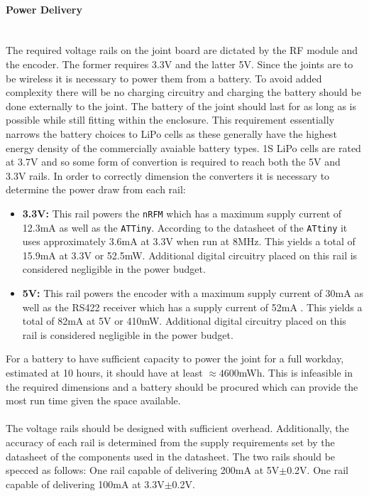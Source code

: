 \paragraph{Power Delivery}~\\ %
\label{par:power_delivery}
The required voltage rails on the joint board are dictated by the RF module and the encoder.
The former requires 3.3V and the latter 5V.
Since the joints are to be wireless it is necessary to power them from a battery.
To avoid added complexity there will be no charging circuitry and charging the battery should be done externally to the joint.
The battery of the joint should last for as long as is possible while still fitting within the enclosure.
This requirement essentially narrows the battery choices to LiPo cells as these generally have the highest energy density of the commercially avaiable battery types.
1S LiPo cells are rated at 3.7V and so some form of convertion is required to reach both the 5V and 3.3V rails.
In order to correctly dimension the converters it is necessary to determine the power draw from each rail:
\begin{itemize}
 	\item \textbf{3.3V:} This rail powers the \texttt{nRFM} which has a maximum supply current of 12.3mA \cite{NFR24L01} as well as the \texttt{ATTiny}.
 	According to the datasheet of the \texttt{ATtiny} it uses approximately 3.6mA at 3.3V when run at 8MHz.   
 	This yields a total of 15.9mA at 3.3V or 52.5mW.
 	Additional digital circuitry placed on this rail is considered negligible in the power budget.
 	\item \textbf{5V:} This rail powers the encoder with a maximum supply current of 30mA \cite{RLC2IC} as well as the RS422 receiver which has a supply current of 52mA \cite{rs422rec}.
 	This yields a total of 82mA at 5V or 410mW.
 	Additional digital circuitry placed on this rail is considered negligible in the power budget.
\end{itemize}
For a battery to have sufficient capacity to power the joint for a full workday, estimated at 10 hours, it should have at least $\approx4600$mWh.
This is infeasible in the required dimensions and a battery should be procured which can provide the most run time given the space available.
\\~\\
The voltage rails should be designed with sufficient overhead.
Additionally, the accuracy of each rail is determined from the supply requirements set by the datasheet of the components used in the datasheet.
The two rails should be specced as follows:
One rail capable of delivering 200mA at 5V$\pm$0.2V.
One rail capable of delivering 100mA at 3.3V$\pm$0.2V.

